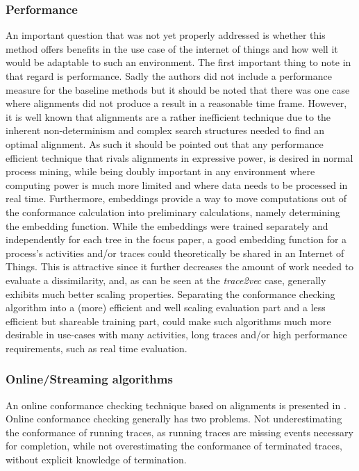 \documentclass[runningheads]{template/llncs}
\begin{document}
\subsubsection{Performance}
An important question that was not yet properly addressed is whether this method offers benefits in the use case of the internet of things and how well it would be adaptable to such an environment.
The first important thing to note in that regard is performance.
Sadly the authors did not include a performance measure for the baseline methods but it should be noted that there was one case where alignments did not produce a result in a reasonable time frame. 
However, it is well known that alignments are a rather inefficient technique due to the inherent non-determinism and complex search structures needed to find an optimal alignment.
As such it should be pointed out that any performance efficient technique that rivals alignments in expressive power, is desired in normal process mining, while being doubly important in any environment where computing power is much more limited and where data needs to be processed in real time.
Furthermore, embeddings provide a way to move computations out of the conformance calculation into preliminary calculations, namely determining the embedding function.
While the embeddings were trained separately and independently for each tree in the focus paper, a good embedding function for a process's activities and/or traces could theoretically be shared in an Internet of Things.
This is attractive since it further decreases the amount of work needed to evaluate a dissimilarity, and, as can be seen at the \emph{trace2vec} case, generally exhibits much better scaling properties.
Separating the conformance checking algorithm into a (more) efficient and well scaling evaluation part and a less efficient but shareable training part, could make such algorithms much more desirable in use-cases with many activities, long traces and/or high performance requirements, such as real time evaluation.
\subsubsection{Online/Streaming algorithms}
An online conformance checking technique based on alignments is presented in \cite{ZBK*19}.
Online conformance checking generally has two problems. Not underestimating the conformance of running traces, as running traces are missing events necessary for completion, while not overestimating the conformance of terminated traces, without explicit knowledge of termination.
\end{document}
